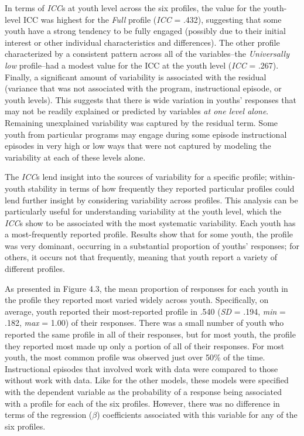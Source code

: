 \documentclass[]{book}
\theoremstyle{definition}
\theoremstyle{definition}
\theoremstyle{definition}
\theoremstyle{remark}
\begin{document}
In terms of \emph{ICC}s at youth level across the six profiles, the
value for the youth-level ICC was highest for the \emph{Full} profile
(\emph{ICC} = .432), suggesting that some youth have a strong tendency
to be fully engaged (possibly due to their initial interest or other
individual characteristics and differences). The other profile
characterized by a consistent pattern across all of the variables--the
\emph{Universally low} profile--had a modest value for the ICC at the
youth level (\emph{ICC} = .267). Finally, a significant amount of
variability is associated with the residual (variance that was not
associated with the program, instructional episode, or youth levels).
This suggests that there is wide variation in youths' responses that may
not be readily explained or predicted by variables \emph{at one level
alone}. Remaining unexplained variability was captured by the residual
term. Some youth from particular programs may engage during some episode
instructional episodes in very high or low ways that were not captured
by modeling the variability at each of these levels alone.

The \emph{ICC}s lend insight into the sources of variability for a
specific profile; within-youth stability in terms of how frequently they
reported particular profiles could lend further insight by considering
variability across profiles. This analysis can be particularly useful
for understanding variability at the youth level, which the \emph{ICC}s
show to be associated with the most systematic variability. Each youth
has a most-frequently reported profile. Results show that for some
youth, the profile was very dominant, occurring in a substantial
proportion of youths' responses; for others, it occurs not that
frequently, meaning that youth report a variety of different profiles.

As presented in Figure 4.3, the mean proportion of responses for each
youth in the profile they reported most varied widely across youth.
Specifically, on average, youth reported their most-reported profile in
.540 (\emph{SD} = .194, \emph{min} = .182, \emph{max} = 1.00) of their
responses. There was a small number of youth who reported the same
profile in all of their responses, but for most youth, the profile they
reported most made up only a portion of all of their responses. For most
youth, the most common profile was observed just over 50\% of the time.
Instructional episodes that involved work with data were compared to
those without work with data. Like for the other models, these models
were specified with the dependent variable as the probability of a
response being associated with a profile for each of the six profiles.
However, there was no difference in terms of the regression (\(\beta\))
coefficients associated with this variable for any of the six profiles.
\end{document}
